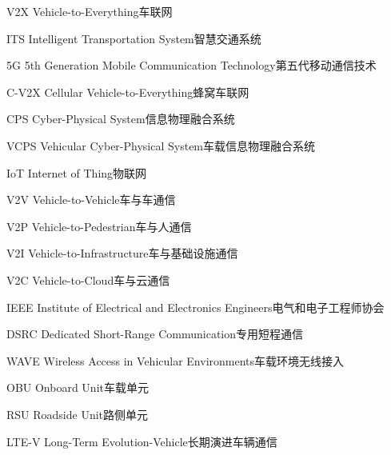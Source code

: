 
\begin{abbreviate}[0mm][15mm]
	\item[V2X] Vehicle-to-Everything\hspace{1em}车联网
	\item[ITS] Intelligent Transportation System\hspace{1em}智慧交通系统
	\item[5G] 5th Generation Mobile Communication Technology\hspace{1em}第五代移动通信技术
	\item[C-V2X] Cellular Vehicle-to-Everything\hspace{1em}蜂窝车联网
	\item[CPS] Cyber-Physical System\hspace{1em}信息物理融合系统
	\item[VCPS] Vehicular Cyber-Physical System\hspace{1em}车载信息物理融合系统
	\item[IoT] Internet of Thing\hspace{1em}物联网
	\item[V2V] Vehicle-to-Vehicle\hspace{1em}车与车通信
	\item[V2P] Vehicle-to-Pedestrian\hspace{1em}车与人通信
	\item[V2I] Vehicle-to-Infrastructure\hspace{1em}车与基础设施通信
	\item[V2C] Vehicle-to-Cloud\hspace{1em}车与云通信
	\item[IEEE] Institute of Electrical and Electronics Engineers\hspace{1em}电气和电子工程师协会
	\item[DSRC] Dedicated Short-Range Communication\hspace{1em}专用短程通信
	\item[WAVE] Wireless Access in Vehicular Environments\hspace{1em}车载环境无线接入
	\item[OBU] Onboard Unit\hspace{1em}车载单元
	\item[RSU] Roadside Unit\hspace{1em}路侧单元
	\item[LTE-V] Long-Term Evolution-Vehicle\hspace{1em}长期演进车辆通信

\end{abbreviate}
